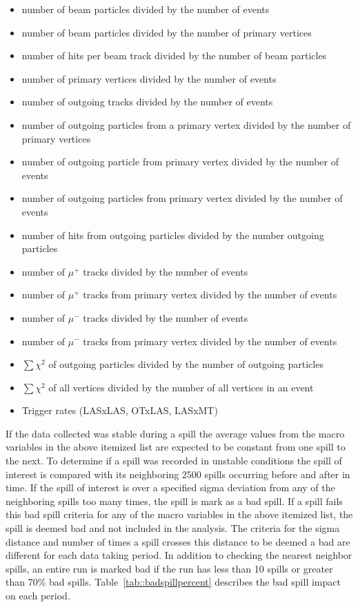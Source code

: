 \begin{itemize}
\item number of beam particles divided by the number of events
\item number of beam particles divided by the number of primary vertices
\item number of hits per beam track divided by the number of beam particles
\item number of primary vertices divided by the number of events
\item number of outgoing tracks divided by the number of events
\item number of outgoing particles from a primary vertex divided by the number
  of primary vertices
\item number of outgoing particle from primary vertex divided by the number of
  events
\item number of outgoing particles from primary vertex divided by the number of
  events
\item number of hits from outgoing particles divided by the number outgoing
  particles
\item number of $\mu^+$ tracks divided by the number of events
\item number of $\mu^+$ tracks from primary vertex divided by the number of
  events
\item number of $\mu^-$ tracks divided by the number of events
\item number of $\mu^-$ tracks from primary vertex divided by the number of
  events
\item $\sum \chi^2$ of outgoing particles divided by the number of outgoing
  particles
\item $\sum \chi^2$ of all vertices divided by the number of all vertices in an
  event
\item Trigger rates (LASxLAS, OTxLAS, LASxMT)
\end{itemize}

If the data collected was stable during a spill the average values from the
macro variables in the above itemized list are expected to be constant
from one spill to the next.  To determine if a spill was recorded in unstable
conditions the spill of interest is compared with its neighboring 2500 spills
occurring before and after in time.  If the spill of interest is over a
specified sigma deviation from any of the neighboring spills too many times, the
spill is mark as a bad spill.  If a spill fails this bad spill criteria for any
of the macro variables in the above itemized list, the spill is deemed
bad and not included in the analysis.  The criteria for the sigma distance and
number of times a spill crosses this distance to be deemed a bad are different
for each data taking period.  In addition to checking the nearest neighbor
spills, an entire run is marked bad if the run has less than 10 spills or
greater than 70\% bad spills.  Table~\ref{tab::badspillpercent} describes the
bad spill impact on each period. \par

